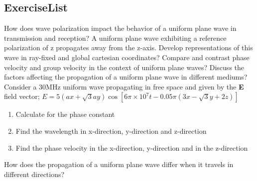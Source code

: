 \begin{mdframed}[backgroundcolor=lightblue, linewidth=1pt,  hidealllines=true]
\section{ExerciseList}
\begin{ExerciseList}
	\Exercise[label={ex11}] How does wave polarization impact the behavior of a uniform plane wave in transmission and reception?
	\Exercise[label={ex11}] A uniform plane wave exhibiting a reference polarization of z propagates away from the z-axis. Develop representations of this wave in ray-fixed and global cartesian coordinates?
	\Exercise[label={ex11}] Compare and contrast phase velocity and group velocity in the context of uniform plane waves?
	\Exercise[label={ex11}] Discuss the factors affecting the propagation of a uniform plane wave in different mediums?
	Consider a 30MHz uniform wave propagating in free space and given by the \textbf{E} field vector;
	$E = 5(a x + \sqrt{3} a y) \cos\left[6\pi \times 10^7 t - 0.05\pi(3x - \sqrt{3}y + 2z)\right]$
\begin{enumerate}
	\item Calculate for the phase constant 
	\item  Find the wavelength in x-direction, y-direction and z-direction 
	\item Find the phase velocity in the x-direction, y-direction and in the z-direction 
\end{enumerate}	
	\Exercise[label={ex11}] How does the propagation of a uniform plane wave differ when it travels in different directions?
\end{ExerciseList}
\end{mdframed}